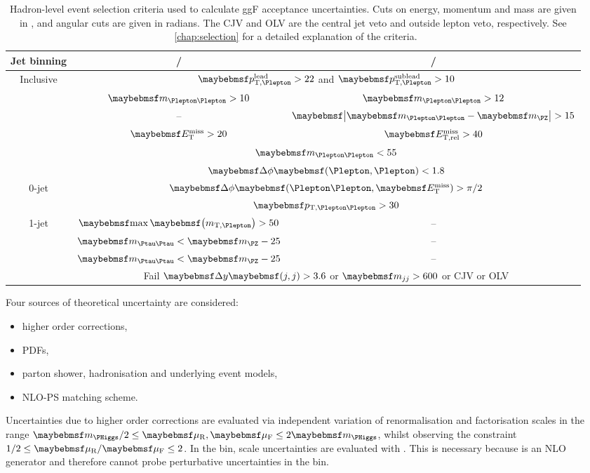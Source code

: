 \begin{table}[t]
	\begin{tabular}{ccc}
		\toprule
		Jet binning & \emch/\mech & \eech/\mmch \\
		\midrule
		Inclusive & \multicolumn{2}{c}{$\ptleadlep > 22$ and $\ptsubleadlep > 10$} \\
		& $\mll > 10$ & $\mll > 12$ \\
		& -- & $\mods{\mll - \mZ} > 15$ \\
		& $\met > 20$ & $\metrel > 40$ \\
		& \multicolumn{2}{c}{$\mll < 55$} \\
		& \multicolumn{2}{c}{$\dphill < 1.8$} \\
		\midrule
		0-jet & \multicolumn{2}{c}{$\dphillmet > \pi/2$} \\
		& \multicolumn{2}{c}{$\ptll > 30$} \\
		\midrule
		1-jet & $\maxmtw > 50$ & -- \\
		& $\mtautau < \mZ - 25$ & -- \\
		\midrule
		\twojet & $\mtautau < \mZ - 25$ & -- \\
		& \multicolumn{2}{c}{Fail $\dyjj > 3.6$ or $\mjj > 600$ or CJV or OLV} \\
		\bottomrule
	\end{tabular}
	\caption{Hadron-level event selection criteria used to calculate ggF acceptance 
	uncertainties. Cuts on energy, momentum and mass are given in \GeV, and angular cuts 
	are given in radians. The CJV and OLV are the central jet veto and outside lepton veto, 
	respectively. See \Chapter~\ref{chap:selection} for a detailed explanation of the 
	criteria.}
	\label{tab:signal:acc_truthselection}
\end{table}

\newpage
Four sources of theoretical uncertainty are considered:
\begin{itemize}[noitemsep,nolistsep]
	\item higher order corrections,
	\item PDFs,
	\item parton shower, hadronisation and underlying event models,
	\item NLO-PS matching scheme.
\end{itemize}

Uncertainties due to higher order corrections are evaluated via independent variation of 
renormalisation and factorisation scales in the range $\mH/2 \leq \mur,\muf \leq 2\mH$, 
whilst observing the constraint $1/2 \leq \mur/\muf \leq 2$. In the \twojet bin, scale 
uncertainties are evaluated  with \mcfm 
\cite{MCFM:H2j}. This is necessary because \powhegbox is an NLO generator and therefore 
cannot probe perturbative uncertainties in the \twojet bin.

